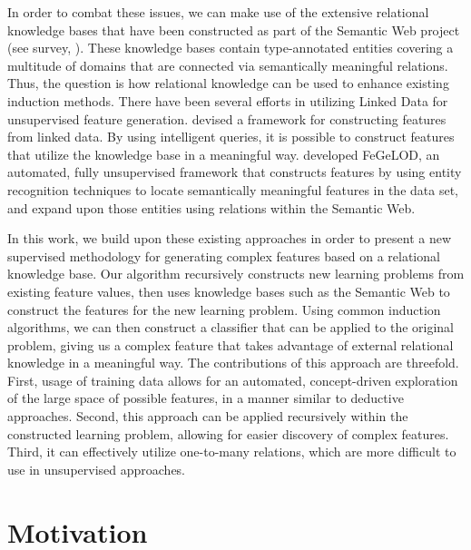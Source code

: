 \documentclass[twoside,11pt]{article}
\theoremstyle{definition}
\begin{document}
In order to combat these issues, we can make use of the extensive relational knowledge bases that have been constructed as part of the Semantic Web project (see survey, ). These knowledge bases contain type-annotated entities covering a multitude of domains that are connected via semantically meaningful relations. Thus, the question is how relational knowledge can be used to enhance existing induction methods.
There have been several efforts in utilizing Linked Data for unsupervised feature generation.  devised a framework for constructing features from linked data. By using intelligent queries, it is possible to construct features that utilize the knowledge base in a meaningful way. 
 developed FeGeLOD, an automated, fully unsupervised framework that constructs features by using entity recognition techniques to locate semantically meaningful features in the data set, and expand upon those entities using relations within the Semantic Web. %

In this work, we build upon these existing approaches in order to present a new supervised methodology for generating complex features based on a relational knowledge base. Our algorithm recursively constructs new learning problems from existing feature values, then uses knowledge bases such as the Semantic Web to construct the features for the new learning problem.
Using common induction algorithms, we can then construct a classifier that can be applied to the original problem, giving us a complex feature that takes advantage of external relational knowledge in a meaningful way.
The contributions of this approach are threefold. First, usage of training data allows for an automated, concept-driven exploration of the large space of possible features, in a manner similar to deductive approaches. Second, this approach can be applied recursively within the constructed learning problem, allowing for easier discovery of complex features. Third, it can effectively utilize one-to-many relations, which are more difficult to use in unsupervised approaches.

\section{Motivation} \label{motivation}
\end{document}
